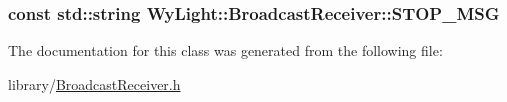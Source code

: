 \hypertarget{class_wy_light_1_1_broadcast_receiver_a7e3c3f4fe453f48d012ecbb15e8cb5e5}{
\subsubsection[{S\-T\-O\-P\-\_\-\-M\-S\-G}]{\setlength{\rightskip}{0pt plus 5cm}const std\-::string Wy\-Light\-::\-Broadcast\-Receiver\-::\-S\-T\-O\-P\-\_\-\-M\-S\-G\hspace{0.3cm}{\ttfamily [static]}}}\label{class_wy_light_1_1_broadcast_receiver_a7e3c3f4fe453f48d012ecbb15e8cb5e5}


The documentation for this class was generated from the following file\-:\begin{DoxyCompactItemize}
\item 
library/\hyperlink{_broadcast_receiver_8h}{Broadcast\-Receiver.\-h}\end{DoxyCompactItemize}
